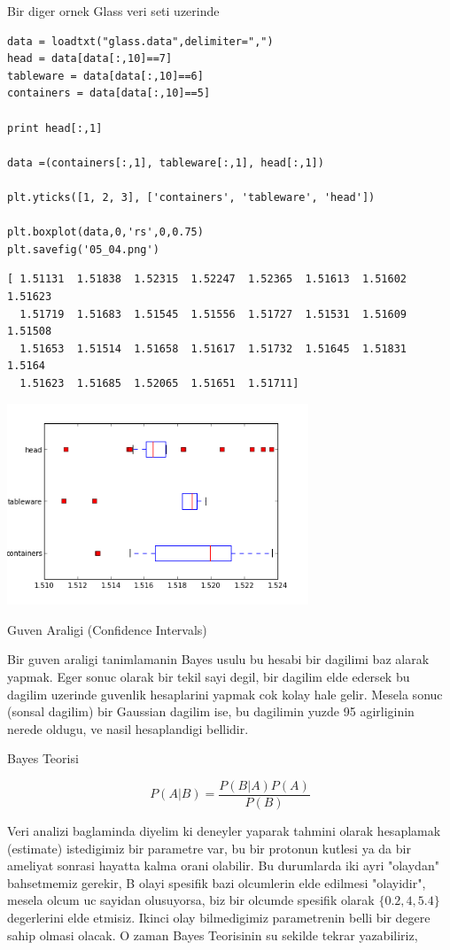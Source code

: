 \documentclass[12pt,fleqn]{article}\usepackage{../common}
\begin{document}
Bir diger ornek Glass veri seti uzerinde

\begin{verbatim}
data = loadtxt("glass.data",delimiter=",")
head = data[data[:,10]==7]
tableware = data[data[:,10]==6]
containers = data[data[:,10]==5]

print head[:,1]

data =(containers[:,1], tableware[:,1], head[:,1])

plt.yticks([1, 2, 3], ['containers', 'tableware', 'head'])

plt.boxplot(data,0,'rs',0,0.75)
plt.savefig('05_04.png')
\end{verbatim}

\begin{verbatim}
[ 1.51131  1.51838  1.52315  1.52247  1.52365  1.51613  1.51602  1.51623
  1.51719  1.51683  1.51545  1.51556  1.51727  1.51531  1.51609  1.51508
  1.51653  1.51514  1.51658  1.51617  1.51732  1.51645  1.51831  1.5164
  1.51623  1.51685  1.52065  1.51651  1.51711]
\end{verbatim}

\includegraphics[height=6cm]{05_04.png}

Guven Araligi (Confidence Intervals)

Bir guven araligi tanimlamanin Bayes usulu bu hesabi bir dagilimi baz
alarak yapmak. Eger sonuc olarak bir tekil sayi degil, bir dagilim elde
edersek bu dagilim uzerinde guvenlik hesaplarini yapmak cok kolay hale
gelir. Mesela sonuc (sonsal dagilim) bir Gaussian dagilim ise, bu dagilimin
yuzde 95 agirliginin nerede oldugu, ve nasil hesaplandigi bellidir.

Bayes Teorisi

$$ P(A|B)  = \frac{ P(B|A)P(A)}{P(B)} $$

Veri analizi baglaminda diyelim ki deneyler yaparak tahmini olarak
hesaplamak (estimate) istedigimiz bir parametre var, bu bir protonun
kutlesi ya da bir ameliyat sonrasi hayatta kalma orani olabilir. Bu
durumlarda iki ayri "olaydan" bahsetmemiz gerekir, B olayi spesifik bazi
olcumlerin elde edilmesi "olayidir", mesela olcum uc sayidan olusuyorsa,
biz bir olcumde spesifik olarak $\{0.2,4,5.4\}$ degerlerini elde
etmisiz. Ikinci olay bilmedigimiz parametrenin belli bir degere sahip
olmasi olacak. O zaman Bayes Teorisinin su sekilde tekrar yazabiliriz, 
\end{document}

